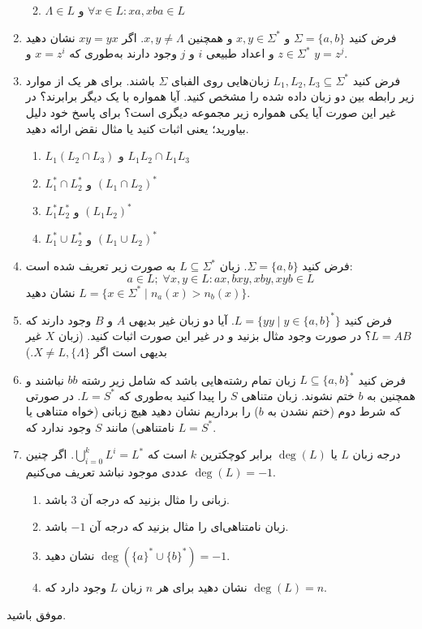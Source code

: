 \documentclass{article}
\renewcommand{\labelenumii}{\alph{enumii})}
\let\oldlabelenumi=\labelenumi
\let\oldlabelenumii=\labelenumii
\newcommand*\circled[1]{
	\tikz[baseline=(char.base)]{
		\node[shape=circle,draw,inner sep=-1pt,color=red] (char) {\textcolor{black}{#1}\strut}
	}\kern-3pt
}
\newcommand{\StartCircledEnumi}{\renewcommand{\labelenumi}{\circled{\oldlabelenumi}}}
\newcommand{\EndCircledEnumi}{\renewcommand{\labelenumi}{\oldlabelenumi}}
\newcommand{\StartCircledEnumii}{\renewcommand{\labelenumii}{\circled{\oldlabelenumii}}}
\newcommand{\EndCircledEnumii}{\renewcommand{\labelenumii}{\oldlabelenumii}}
\begin{document}
\begin{enumerate}
\begin{enumerate}
			\StartCircledEnumii
			\item
			\EndCircledEnumii
			$\Lambda \in L$
			و
			$\forall x \in L : xa, xba \in L$

		\end{enumerate}
	\item
فرض کنید 
$\Sigma = \{a, b\}$
و
$x,y \in \Sigma^*$
و همچنین
$x,y \neq \Lambda$.
اگر 
$xy = yx$
نشان دهید 
$z \in \Sigma^* $ 
و اعداد طبیعی $i$ و $j$ وجود دارند به‌طوری که
$x = z^i$
و
$y = z^j$.	


	\item
	فرض کنید 
	$L_1, L_2, L_3 \subseteq \Sigma^*$
	زبان‌هایی روی الفبای $\Sigma$ باشند. برای هر یک از موارد زیر رابطه بین دو زبان داده شده را مشخص کنید. آیا همواره با یک دیگر برابرند؟ در غیر این صورت آیا یکی همواره زیر مجموعه دیگری است؟ برای پاسخ خود دلیل بیاورید؛ یعنی اثبات کنید یا مثال نقض ارائه دهید.
	\begin{enumerate}
		\item 
		$L_1(L_2 \cap L_3)$
		و
		$L_1L_2 \cap L_1L_3$
		\item
		$L_1^* \cap L_2^*$
		و
		$(L_1 \cap L_2)^*$
		\item
		$L_1^*L_2^*$
		و
		$(L_1L_2)^*$
		\StartCircledEnumii
		\item 
		\EndCircledEnumii
		$L_1^* \cup L_2^*$
		و
		$(L_1 \cup L_2)^*$
	\end{enumerate}

\StartCircledEnumi
\item
\EndCircledEnumi
فرض کنید 
$\Sigma = \{a, b\}$.
زبان 
$L \subseteq \Sigma^*$
به صورت زیر تعریف شده است:
$$a \in L; \; \forall x,y \in L : ax, bxy, xby, xyb \in L$$
نشان دهید
$L = \{x \in \Sigma^* \; | \; n_a(x) > n_b(x)\}$.

\StartCircledEnumi
\item
\EndCircledEnumi
فرض کنید
$L = \{yy \; | \; y \in \{a, b\}^*\}$. 
آیا دو زبان غیر بدیهی $A$ و $B$ وجود دارند که $L=AB$؟ در صورت وجود مثال بزنید و در غیر این صورت اثبات کنید.
(زبان $X$ غیر بدیهی است اگر $X \neq L, \{\Lambda\}$.)
\StartCircledEnumi
\item
\EndCircledEnumi
فرض کنید 
$L \subseteq \{a, b\}^*$
زبان تمام رشته‌هایی باشد که شامل زیر رشته $bb$ نباشند و همچنین به $b$ ختم نشوند. زبان متناهی $S$ را پیدا کنید به‌طوری که $L = S^*$. در صورتی که شرط دوم (ختم نشدن به $b$) را برداریم نشان دهید هیچ زبانی (خواه متناهی یا نامتناهی) مانند $S$ وجود ندارد که 
$L = S^*$.
\StartCircledEnumi
\item
\EndCircledEnumi
درجه زبان $L$  یا
$\deg(L)$
برابر کوچکترین $k$ است که
$\bigcup\limits_{i = 0}^{k} L^i = L^*$. 
اگر چنین عددی موجود نباشد تعریف می‌کنیم
$\deg(L) = -1$.
\begin{enumerate}
	\item 
	زبانی را مثال بزنید که درجه آن $3$ باشد.
	\item
	زبان نامتناهی‌ای را مثال بزنید که درجه آن 
	$-1$
	باشد.
	\item
	نشان دهید
	$\deg(\{a\}^* \cup \{b\}^*) = -1$.
	\item
	نشان دهید برای هر $n$ زبان $L$ وجود دارد که 
	$\deg(L) = n$.
	
\end{enumerate}
	\end{enumerate}
\begin{flushleft}
	موفق باشید.
\end{flushleft}
	
\end{document}
